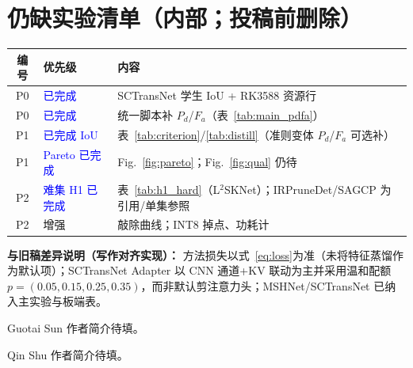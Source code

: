 \documentclass[lettersize,journal]{IEEEtran}
\begin{document}
\appendix
\section*{仍缺实验清单（内部；投稿前删除）}
\begin{center}
\footnotesize
\begin{tabular}{|c|l|p{6.2cm}|}
\hline
编号 & 优先级 & 内容 \\
\hline
P0 & \textcolor{blue}{已完成} & SCTransNet 学生 IoU + RK3588 资源行 \\
\hline
P0 & \textcolor{blue}{已完成} & 统一脚本补 $P_d$/$F_a$（表~\ref{tab:main_pdfa}） \\
\hline
P1 & \textcolor{blue}{已完成 IoU} & 表~\ref{tab:criterion}/\ref{tab:distill}（准则变体 $P_d$/$F_a$ 可选补） \\
\hline
P1 & \textcolor{blue}{Pareto 已完成} & Fig.~\ref{fig:pareto}；Fig.~\ref{fig:qual} 仍待 \\
\hline
P2 & \textcolor{blue}{难集 H1 已完成} & 表~\ref{tab:h1_hard}（L$^2$SKNet）；IRPruneDet/SAGCP 为引用/单集参照 \\
\hline
P2 & 增强 & 敲除曲线；INT8 掉点、功耗计 \\
\hline
\end{tabular}
\end{center}

\noindent\textbf{与旧稿差异说明（写作对齐实现）：}
方法损失以式~\eqref{eq:loss}为准（未将特征蒸馏作为默认项）；SCTransNet Adapter 以 CNN 通道+KV 联动为主并采用温和配额 $p=(0.05,0.15,0.25,0.35)$，而非默认剪注意力头；MSHNet/SCTransNet 已纳入主实验与板端表。




\vspace{11pt}

\begin{IEEEbiographynophoto}{Guotai Sun}
作者简介待填。
\end{IEEEbiographynophoto}

\begin{IEEEbiographynophoto}{Qin Shu}
作者简介待填。
\end{IEEEbiographynophoto}

\vfill
\end{document}
